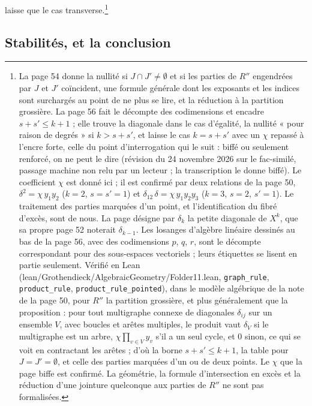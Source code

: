 \documentclass[11pt,a4paper]{article}
\begin{document}
laisse que le cas transverse.\footnote{La page 54 donne la nullité si
$J \cap J' \neq \emptyset$ et si les parties de $R''$ engendrées par $J$ et
$J'$ coïncident, une formule générale dont les exposants et les indices sont
surchargés au point de ne plus se lire, et la réduction à la partition
grossière. La page 56 fait le décompte des codimensions et encadre
$s + s' \leq k + 1$ ; elle trouve la diagonale dans le cas d'égalité, la
nullité « pour raison de degrés » si $k > s + s'$, et laisse le cas
$k = s + s'$ avec un $\chi$ repassé à l'encre forte, celle du point
d'interrogation qui le suit : biffé ou seulement renforcé, on ne peut le dire
(révision du 24 novembre 2026 sur le fac-similé,
passage machine non relu par un lecteur ; la transcription le donne biffé). Le
coefficient $\chi$ est donné ici ; il est confirmé par deux relations de la
page 50, $\delta^{2} = \chi\, y_{1}y_{2}$ ($k = 2$, $s = s' = 1$) et
$\delta_{12}\,\delta = \chi\, y_{1}y_{2}y_{3}$ ($k = 3$, $s = 2$, $s' = 1$).
Le traitement des parties marquées d'un point, et l'identification du fibré
d'excès, sont de nous. La page désigne par $\delta_{k}$ la petite diagonale de
$X^{k}$, que sa propre page 52 noterait $\delta_{k-1}$. Les losanges d'algèbre
linéaire dessinés au bas de la page 56, avec des codimensions $p$, $q$, $r$,
sont le décompte correspondant pour des sous-espaces vectoriels ; leurs
étiquettes se lisent en partie seulement. Vérifié en Lean
(lean/Grothendieck/AlgebraicGeometry/Folder11.lean, \texttt{graph\_rule},
\texttt{product\_rule}, \texttt{product\_rule\_pointed}), dans le modèle
algébrique de la note de la page 50, pour $R''$ la partition grossière, et plus
généralement que la proposition : pour tout multigraphe connexe de diagonales
$\delta_{ij}$ sur un ensemble $V$, avec boucles et arêtes multiples, le
produit vaut $\delta_{V}$ si le multigraphe est un arbre, $\chi \prod_{v \in V}
y_{v}$ s'il a un seul cycle, et $0$ sinon, ce qui se voit en contractant les
arêtes ; d'où la borne $s + s' \leq k + 1$, la table pour $J = J' =
\emptyset$, et celle des parties marquées d'un ou de deux points. Le $\chi$ que
la page biffe est confirmé. La géométrie, la formule d'intersection en excès et
la réduction d'une jointure quelconque aux parties de $R''$ ne sont pas
formalisées.}

\subsection*{Stabilités, et la conclusion}
\end{document}
